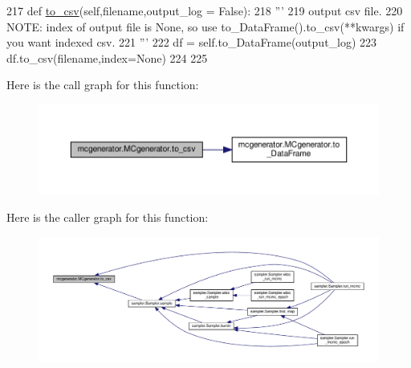 \begin{DoxyCode}
217     \textcolor{keyword}{def }\hyperlink{classsampler_1_1Sampler_a57168d6c5801b89109e2a2cd7d7ff4ce}{to\_csv}(self,filename,output\_log = False):
218         \textcolor{stringliteral}{'''}
219 \textcolor{stringliteral}{        output csv file.}
220 \textcolor{stringliteral}{        NOTE: index of output file is None, so use to\_DataFrame().to\_csv(**kwargs) if you want indexed csv.}
221 \textcolor{stringliteral}{        '''}
222         df = self.to\_DataFrame(output\_log)
223         df.to\_csv(filename,index=\textcolor{keywordtype}{None})
224 
225 
\end{DoxyCode}
Here is the call graph for this function\+:\nopagebreak
\begin{figure}[H]
\begin{center}
\leavevmode
\includegraphics[width=350pt]{d3/dad/classmcgenerator_1_1MCgenerator_adfd3a69e271b805a3fa48d6b3f14b0f5_cgraph}
\end{center}
\end{figure}
Here is the caller graph for this function\+:\nopagebreak
\begin{figure}[H]
\begin{center}
\leavevmode
\includegraphics[width=350pt]{d3/dad/classmcgenerator_1_1MCgenerator_adfd3a69e271b805a3fa48d6b3f14b0f5_icgraph}
\end{center}
\end{figure}
\mbox{\label{classmcgenerator_1_1MCgenerator_ac5245cc93c2aa162abe1757ffdf60699}} 
